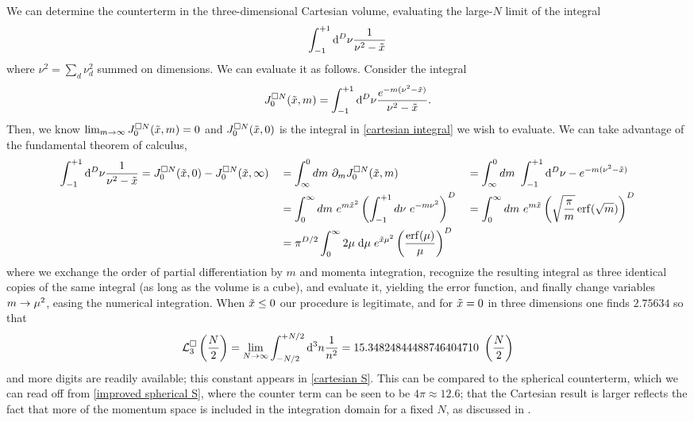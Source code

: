 We can determine the counterterm in the three-dimensional Cartesian volume, evaluating the large-$N$ limit of the integral
\begin{equation}\label{eq:cartesian integral}
    \int_{-1}^{+1} \mathrm{d}^D\nu \frac{1}{\nu^2 - \tilde{x}}
\end{equation}
where $\nu^2 = \sum_d \nu_d^2$ summed on dimensions.
We can evaluate it as follows.  Consider the integral
\begin{equation}
	J^{\square N}_0(\tilde{x}, m) = \int_{-1}^{+1} \mathrm{d}^D\nu \frac{e^{-m (\nu^2-\tilde{x})}}{\nu^2-\tilde{x}}.
\end{equation}
Then, we know $\lim_{m\rightarrow\infty} J^{\square N}_0(\tilde{x}, m) = 0$ and $J^{\square N}_0(\tilde{x}, 0)$ is the integral in \eqref{cartesian integral} we wish to evaluate.
We can take advantage of the fundamental theorem of calculus,
\begin{align}
	\int_{-1}^{+1} \mathrm{d}^D\nu \frac{1}{\nu^2-\tilde{x}}
    &=
    J^{\square N}_0(\tilde{x},0) - J^{\square N}_0(\tilde{x},\infty)
		&&= 	\int_{\infty}^{0} dm\ \partial_m J^{\square N}_0(\tilde{x},m)
		&&=	\int_{\infty}^{0} dm\ \int_{-1}^{+1} \mathrm{d}^D\nu -e^{-m (\nu^2-\tilde{x})}
		\nonumber\\
		&&&=	\int_0^\infty dm\ e^{m \tilde{x}^2}\left(\int_{-1}^{+1} d\nu\ e^{-m \nu^2}\right)^D
		&&=	\int_0^\infty dm\ e^{m\tilde{x}}\left(\sqrt{\frac{\pi}{m}} \operatorname{erf}(\sqrt{m})\right)^D
        \nonumber\\
    &&&=
    \pi^{D/2} \int_{0}^{\infty} 2\mu\; \mathrm{d}\mu\; e^{\tilde{x} \mu^2} \left(\frac{\operatorname{erf}(\mu)}{\mu}\right)^D
\end{align}
where we exchange the order of partial differentiation by $m$ and momenta integration, recognize the resulting integral as three identical copies of the same integral (as long as the volume is a cube), and evaluate it, yielding the error function, and finally change variables $m\rightarrow\mu^2$, easing the numerical integration.
When $\tilde{x}\leq0$ our procedure is legitimate, and for $\tilde{x}=0$ in three dimensions one finds $2.75634$ so that
\begin{equation}
    \label{eq:cartesian counterterm}
    \mathcal{L}^\square_3 \left(\frac{N}{2}\right) = \lim_{N\rightarrow\infty}\int_{-N/2}^{+N/2} \mathrm{d}^3n \frac{1}{n^2} = 15.34824844488746404710\ \left(\frac{N}{2}\right)
\end{equation}
and more digits are readily available; this constant appears in \eqref{cartesian S}.
This can be compared to the spherical counterterm, which we can read off from \eqref{improved spherical S}, where the counter term can be seen to be $4\pi \approx 12.6 $; that the Cartesian result is larger reflects the fact that more of the momentum space is included in the integration domain for a fixed $N$, as discussed in .

